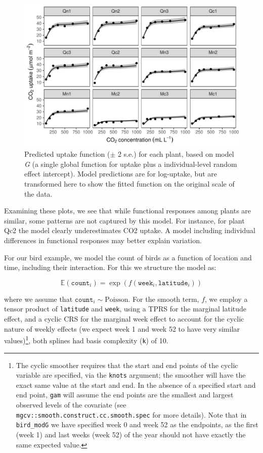 \documentclass[12pt]{article}
\let\rmarkdownfootnote\footnote%
\def\footnote{\protect\rmarkdownfootnote}
\begin{document}
\begin{figure}
\includegraphics[width=\linewidth]{../figures/Fig7} \caption{\label{fig:Fig7} Predicted uptake function ($\pm$ 2 s.e.) for each plant, based on model \emph{G} (a single global function for uptake plus a individual-level random effect intercept). Model predictions are for log-uptake, but are transformed here to show the fitted function on the original scale of the data.}\label{fig:Fig7}
\end{figure}

Examining these plots, we see that while functional responses among
plants are similar, some patterns are not captured by this model. For
instance, for plant Qc2 the model clearly underestimates CO2 uptake. A
model including individual differences in functional responses may
better explain variation.

For our bird example, we model the count of birds as a function of
location and time, including their interaction. For this we structure
the model as:

\[
\mathbb{E}(\texttt{count}_i) = \exp(f(\texttt{week}_i, \texttt{latitude}_i))
\]

where we assume that \(\texttt{count}_i \sim\text{Poisson}\). For the
smooth term, \(f\), we employ a tensor product of \texttt{latitude} and
\texttt{week}, using a TPRS for the marginal latitude effect, and a
cyclic CRS for the marginal week effect to account for the cyclic nature
of weekly effects (we expect week 1 and week 52 to have very similar
values)\footnote{The cyclic smoother requires that the start and end
  points of the cyclic variable are specified, via the \texttt{knots}
  argument; the smoother will have the exact same value at the start and
  end. In the absence of a specified start and end point, \texttt{gam}
  will assume the end points are the smallest and largest observed
  levels of the covariate (see
  \texttt{mgcv::smooth.construct.cc.smooth.spec} for more details). Note
  that in \texttt{bird\_modG} we have specified week 0 and week 52 as
  the endpoints, as the first (week 1) and last weeks (week 52) of the
  year should not have exactly the same expected value.}, both splines
had basis complexity (\texttt{k}) of 10.
\end{document}
